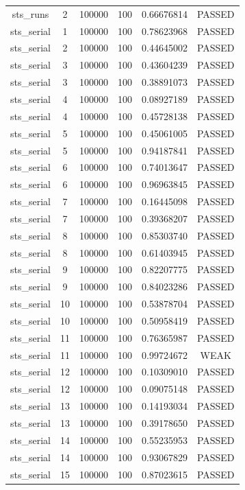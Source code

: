 \begin{longtable}{cccccc}
sts\_runs & 2 & 100000 & 100 & 0.66676814 & PASSED \\
sts\_serial & 1 & 100000 & 100 & 0.78623968 & PASSED \\
sts\_serial & 2 & 100000 & 100 & 0.44645002 & PASSED \\
sts\_serial & 3 & 100000 & 100 & 0.43604239 & PASSED \\
sts\_serial & 3 & 100000 & 100 & 0.38891073 & PASSED \\
sts\_serial & 4 & 100000 & 100 & 0.08927189 & PASSED \\
sts\_serial & 4 & 100000 & 100 & 0.45728138 & PASSED \\
sts\_serial & 5 & 100000 & 100 & 0.45061005 & PASSED \\
sts\_serial & 5 & 100000 & 100 & 0.94187841 & PASSED \\
sts\_serial & 6 & 100000 & 100 & 0.74013647 & PASSED \\
sts\_serial & 6 & 100000 & 100 & 0.96963845 & PASSED \\
sts\_serial & 7 & 100000 & 100 & 0.16445098 & PASSED \\
sts\_serial & 7 & 100000 & 100 & 0.39368207 & PASSED \\
sts\_serial & 8 & 100000 & 100 & 0.85303740 & PASSED \\
sts\_serial & 8 & 100000 & 100 & 0.61403945 & PASSED \\
sts\_serial & 9 & 100000 & 100 & 0.82207775 & PASSED \\
sts\_serial & 9 & 100000 & 100 & 0.84023286 & PASSED \\
sts\_serial & 10 & 100000 & 100 & 0.53878704 & PASSED \\
sts\_serial & 10 & 100000 & 100 & 0.50958419 & PASSED \\
sts\_serial & 11 & 100000 & 100 & 0.76365987 & PASSED \\
sts\_serial & 11 & 100000 & 100 & 0.99724672 & WEAK \\
sts\_serial & 12 & 100000 & 100 & 0.10309010 & PASSED \\
sts\_serial & 12 & 100000 & 100 & 0.09075148 & PASSED \\
sts\_serial & 13 & 100000 & 100 & 0.14193034 & PASSED \\
sts\_serial & 13 & 100000 & 100 & 0.39178650 & PASSED \\
sts\_serial & 14 & 100000 & 100 & 0.55235953 & PASSED \\
sts\_serial & 14 & 100000 & 100 & 0.93067829 & PASSED \\
sts\_serial & 15 & 100000 & 100 & 0.87023615 & PASSED \\

\end{longtable}
